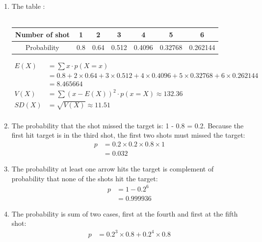 \documentclass[a4paper]{article}
\begin{document}
\begin{enumerate}
	\item The table : \\ \\
	      \begin{tabular}{|c|c|c|c|c|c|c|}
		      \hline
		      Number of shot & 1   & 2    & 3     & 4      & 5       & 6        \\
		      \hline
		      Probability    & 0.8 & 0.64 & 0.512 & 0.4096 & 0.32768 & 0.262144 \\
		      \hline
	      \end{tabular}
	      \begin{align*}
		      E(X)  & = \sum x\cdot p(X = x)                                                                      \\
		            & = 0.8 + 2\times 0.64 + 3\times 0.512 + 4\times 0.4096 + 5\times 0.32768 + 6 \times 0.262144 \\
		            & = 8.465664                                                                                  \\
		      V(X)  & = \sum (x - E(X))^{2}\cdot p (x = X) \approx 132.36                                         \\
		      SD(X) & = \sqrt{V(X)} \approx 11.51                                                                 \\
	      \end{align*}
	\item 
	      The probability that the shot missed the target is: 1 - 0.8 = 0.2.
	      Because the first hit target is in the third shot, the first two shots must missed the target:
	      \begin{align*}
		      p & = 0.2\times 0.2 \times 0.8 \times 1 \\ 
		        & =0.032
	      \end{align*}
	\item
	      The probability at least one arrow hits the target is complement of probability that none of the shots hit the target:
	      \begin{align*}
		      p & = 1 - 0.2^6 \\
		        & = 0.999936
	      \end{align*}
	\item 
	      The probability is sum of two cases, first at the fourth and first at the fifth shot:
	      \begin{align*}
		      p & = 0.2^3 \times 0.8 + 0.2^4 \times 0.8 \\

\end{align*}
\end{enumerate}
\end{document}

